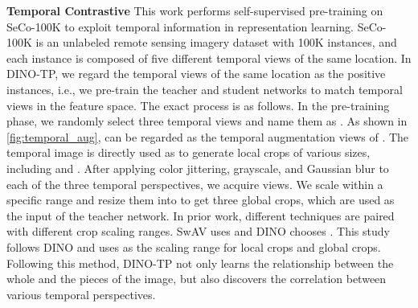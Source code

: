\documentclass[10pt,twocolumn,letterpaper]{article}
\begin{document}
\textbf{Temporal Contrastive } 
This work performs self-supervised pre-training on SeCo-100K \cite{manas2021seasonal} to exploit temporal information in representation learning.
SeCo-100K is an unlabeled remote sensing imagery dataset with 100K instances, and each instance is composed of five different temporal views of the same location.
In DINO-TP, we regard the temporal views of the same location as the positive instances, i.e., we pre-train the teacher and student networks to match temporal views in the feature space.
The exact process is as follows.
In the pre-training phase, we randomly select three temporal views and name them as .
As shown in \cref{fig:temporal_aug},  can be regarded as the temporal augmentation views of .
The temporal image  is directly used as  to generate  local crops of various sizes, including  and .
After applying color jittering, grayscale, and Gaussian blur to each of the three temporal perspectives, we acquire  views.
We scale  within a specific range and resize them into  to get three global crops, which are used as the input of the teacher network.
In prior work, different techniques are paired with different crop scaling ranges.
SwAV uses  \cite{caron2020unsupervised} and DINO chooses  \cite{caron2021emerging}.
This study follows DINO and uses  as the scaling range for local crops and global crops.
Following this method, DINO-TP not only learns the relationship between the whole and the pieces of the image, but also discovers the correlation between various temporal perspectives.
\end{document}
